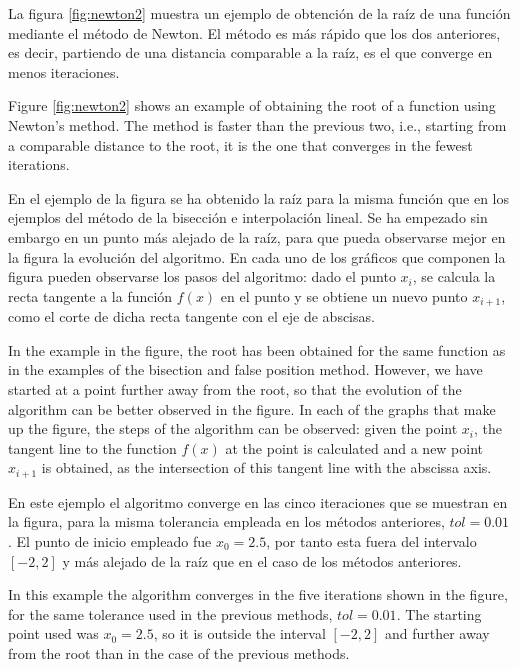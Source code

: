 \begin{paracol}{2}
La figura \ref{fig:newton2} muestra un ejemplo de obtención de la raíz de una función mediante el método de Newton. El método es más rápido que los dos anteriores, es decir, partiendo de una distancia comparable a la raíz, es el que converge en menos iteraciones. 

\switchcolumn

Figure \ref{fig:newton2} shows an example of obtaining the root of a function using Newton's method. The method is faster than the previous two, i.e., starting from a comparable distance to the root, it is the one that converges in the fewest iterations.

\switchcolumn

En el ejemplo de la figura se ha obtenido la raíz para la misma función que en los ejemplos del método de la bisección e interpolación lineal. Se ha empezado sin embargo en un punto más alejado de la raíz, para que pueda observarse mejor en la figura la evolución del algoritmo. En cada uno de los gráficos que componen la figura pueden observarse  los pasos del algoritmo: dado el punto  $x_i$, se calcula  la recta tangente a la función $f(x)$ en el punto y se obtiene un nuevo punto $x_{i+1}$,  como el corte de dicha recta tangente con el eje de abscisas.

\switchcolumn


In the example in the figure, the root has been obtained for the same function as in the examples of the bisection and false position method. However, we have started at a point further away from the root, so that the evolution of the algorithm can be better observed in the figure. In each of the graphs that make up the figure, the steps of the algorithm can be observed: given the point $x_i$, the tangent line to the function $f(x)$ at the point is calculated and a new point $x_{i+1}$ is obtained, as the intersection of this tangent line with the abscissa axis.

\switchcolumn

En este ejemplo el algoritmo converge en las cinco iteraciones que se muestran en la figura, para la misma tolerancia empleada en los métodos anteriores, $tol=0.01$. El punto de inicio empleado fue $x_0=2.5$, por tanto esta fuera del intervalo $[-2, 2]$ y más alejado de la raíz que en el caso de los métodos anteriores.   

\switchcolumn

In this example the algorithm converges in the five iterations shown in the figure, for the same tolerance used in the previous methods, $tol=0.01$. The starting point used was $x_0=2.5$, so it is outside the interval $[-2, 2]$ and further away from the root than in the case of the previous methods.   


\end{paracol}
